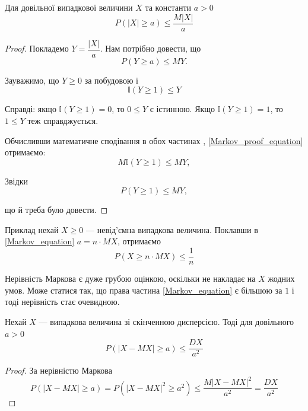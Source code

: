 \begin{theorem}
    Для довільної випадкової величини $X$ та
    константи $a > 0$
    \begin{equation}
        \label{Markov_equation}
        P(|X| \geqslant a) \leqslant \dfrac{M|X|}{a}
    \end{equation}
\end{theorem}
\begin{proof}
    Покладемо $Y = \dfrac{|X|}{a}$. Нам потрібно
    довести, що
    $$P(Y \geqslant a) \leqslant MY.$$

    Зауважимо, що $Y \geqslant 0$ за побудовою і 
    \begin{equation}
    \label{Markov_proof_equation}
        \mathbb{I}(Y \geqslant 1) \leqslant Y
    \end{equation}

    Справді: якщо $\mathbb{I}(Y \geqslant 1) = 0$,
    то $0 \leqslant Y$ є істинною.
    Якщо $\mathbb{I}(Y \geqslant 1) = 1$, то
    $1 \leqslant Y$ теж справджується.

    Обчисливши математичне сподівання в обох частинах , 
    \ref{Markov_proof_equation} отримаємо:
    $$M\mathbb{I}(Y \geqslant 1) \leqslant MY,$$

    Звідки
    $$P(Y \geqslant 1) \leqslant MY,$$

    що й треба було довести.
\end{proof}

\begin{example}
    Приклад нехай $X \geqslant 0$ --- невід'ємна
    випадкова величина.
    Поклавши в \ref{Markov_equation} $a = n \cdot MX$,
    отримаємо
    \begin{equation}
        P(X \geqslant n \cdot MX) \leqslant \dfrac{1}{n}
    \end{equation}
\end{example}

Нерівність Маркова є дуже грубою оцінкою,
оскільки не накладає на $X$ жодних умов.
Може статися так, що права частина \ref{Markov_equation}
є більшою за $1$ і тоді нерівність стає очевидною.

\begin{theorem}
    Нехай $X$ --- випадкова величина зі скінченною дисперсією.
    Тоді для довільного $a > 0$
    \begin{equation}
    \label{Chebyshev_equation}
        P(|X - MX| \geqslant a) \leqslant \dfrac{DX}{a^2}
    \end{equation}
\end{theorem}
\begin{proof}
    За нерівністю Маркова
    $$P(|X - MX| \geqslant a) = P(|X - MX|^2 \geqslant a^2) 
    \leqslant \dfrac{M|X - MX|^2}{a^2} = \dfrac{DX}{a^2}$$
\end{proof}

